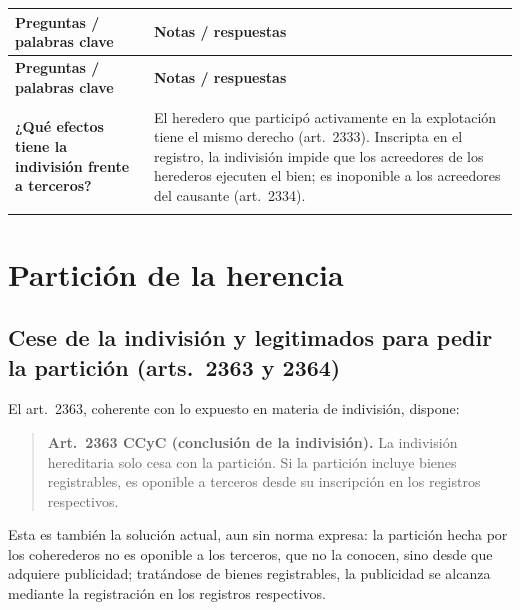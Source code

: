 \documentclass[12pt,oneside]{book}
\newenvironment{cornell}{%
    \begin{longtable}{>{\raggedright\arraybackslash}p{0.27\textwidth}
                      >{\raggedright\arraybackslash}p{0.66\textwidth}}
    \toprule
    \textbf{Preguntas / palabras clave} & \textbf{Notas / respuestas} \\
    \midrule
    \endfirsthead
    \toprule
    \textbf{Preguntas / palabras clave} & \textbf{Notas / respuestas} \\
    \midrule
    \endhead
    \midrule[0.3pt]
    \multicolumn{2}{r}{\footnotesize\textit{Continúa en la página siguiente}} \\
    \endfoot
    \endlastfoot
}{%
    \end{longtable}
}
\newcommand{\cornellrow}[2]{%
    \textbf{#1} & #2 \\
    \midrule[0.3pt]
}
\newcommand{\cornellsummary}[1]{%
    \midrule
    \multicolumn{2}{p{\dimexpr0.93\textwidth+2\tabcolsep\relax}}{%
        \textbf{Resumen:} #1} \\
    \bottomrule
}
\begin{document}
\begin{cornell}
\cornellrow{¿Qué efectos tiene la indivisión frente a terceros?}{El heredero que participó activamente en la explotación tiene el mismo derecho (art.~2333). Inscripta en el registro, la indivisión impide que los acreedores de los herederos ejecuten el bien; es inoponible a los acreedores del causante (art.~2334).}
\cornellsummary{La indivisión nace con la muerte del causante cuando hay más de un heredero y solo termina con la partición. Mientras dura, la herencia se administra judicial o extrajudicialmente, el uso exclusivo genera compensación desde el requerimiento, los frutos acrecen a la masa, las deudas se pagan según la cuota y las cargas según la masa, y cada coheredero puede reivindicar frente a terceros. El principio de partición en todo tiempo admite excepciones: la indivisión impuesta por el testador, la convenida por los herederos y la que pide el cónyuge o un heredero que participó en una unidad económica, todas con plazo y requisitos propios.}
\end{cornell}
\chapter[Partición de la herencia]{Partición de la herencia}

\section[Cese de la indivisión y legitimados (arts.~2363 y 2364)]{Cese de la indivisión y legitimados para pedir la partición (arts.~2363 y 2364)}

El art.~2363, coherente con lo expuesto en materia de indivisión, dispone:

\begin{quote}
\textbf{Art.~2363 CCyC (conclusión de la indivisión).} La indivisión hereditaria solo cesa con la partición. Si la partición incluye bienes registrables, es oponible a terceros desde su inscripción en los registros respectivos.
\end{quote}

Esta es también la solución actual, aun sin norma expresa: la partición hecha por los coherederos no es oponible a los terceros, que no la conocen, sino desde que adquiere publicidad; tratándose de bienes registrables, la publicidad se alcanza mediante la registración en los registros respectivos.
\end{document}
